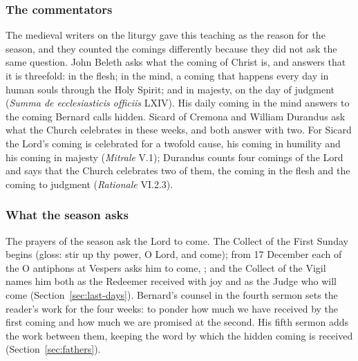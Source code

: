 \subsubsection{The commentators}

The medieval writers on the liturgy gave this teaching as the reason for the season, and they
counted the comings differently because they did not ask the same question. John Beleth asks
what the coming of Christ is, and answers that it is threefold: in the flesh; in the mind, a
coming that happens every day in human souls through the Holy Spirit; and in majesty, on the day
of judgment (\textit{Summa de ecclesiasticis officiis} LXIV). His daily coming in the mind
answers to the coming Bernard calls hidden. Sicard of Cremona and William Durandus ask what the
Church celebrates in these weeks, and both answer with two. For Sicard the Lord's coming is
celebrated for a twofold cause, his coming in humility and his coming in majesty
(\textit{Mitrale} V.1); Durandus counts four comings of the Lord and says that the Church
celebrates two of them, the coming in the flesh and the coming to judgment (\textit{Rationale}
VI.2.3).

\subsubsection{What the season asks}

The prayers of the season ask the Lord to come. The Collect of the First Sunday begins
 (gloss: stir up thy power, O Lord,
and come); from 17 December each of the O antiphons at Vespers asks him to come, ;
and the Collect of the Vigil names him both as the Redeemer received with joy and as the Judge
who will come (Section~\ref{sec:last-days}). Bernard's counsel in the fourth sermon sets the
reader's work for the four weeks: to ponder how much we have received by the first coming and how
much we are promised at the second. His fifth sermon adds the work between them, keeping the word
by which the hidden coming is received (Section~\ref{sec:fathers}).
